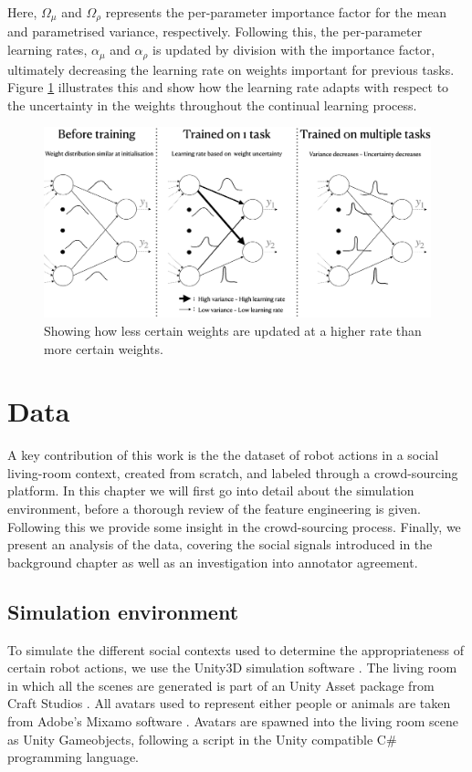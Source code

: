 \documentclass[a4paper,12pt]{report}
\begin{document}
Here, $\Omega_{\mu}$ and $\Omega_{\rho}$ represents the per-parameter importance factor for the mean and parametrised variance, respectively. Following this, the per-parameter learning rates, $\alpha_{\mu}$ and $\alpha_{\rho}$ is updated by division with the importance factor, ultimately decreasing the learning rate on weights important for previous tasks. Figure \ref{ucb} illustrates this and show how the learning rate adapts with respect to the uncertainty in the weights throughout the continual learning process.

\begin{figure}[h]
\centering
\includegraphics[width=13.5cm]{figs/ucb.png}
\caption{Showing how less certain weights are updated at a higher rate than more certain weights.}
\label{ucb}
\end{figure}

\chapter{Data}
A key contribution of this work is the the dataset of robot actions in a social living-room context, created from scratch, and labeled through a crowd-sourcing platform. In this chapter we will first go into detail about the simulation environment, before a thorough review of the feature engineering is given. Following this we provide some insight in the crowd-sourcing process. Finally, we present an analysis of the data, covering the social signals introduced in the background chapter as well as an investigation into annotator agreement.

\section{Simulation environment}
To simulate the different social contexts used to determine the appropriateness of certain robot actions, we use the Unity3D simulation software \cite{unity}. The living room in which all the scenes are generated is part of an Unity Asset package from Craft Studios \cite{apartment}. All avatars used to represent either people or animals are taken from Adobe's Mixamo software \cite{avatar}. Avatars are spawned into the living room scene as Unity Gameobjects, following a script in the Unity compatible C\# programming language.
\end{document}
